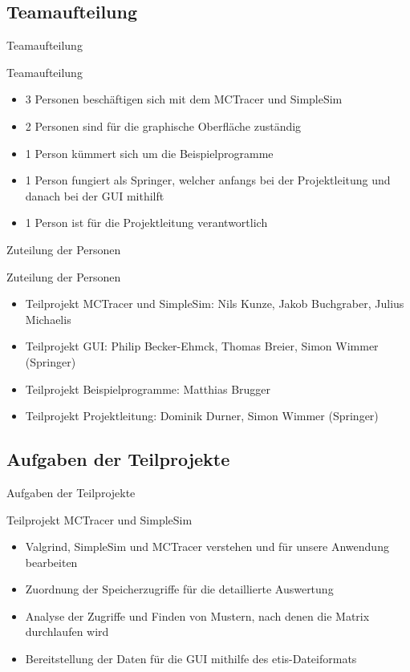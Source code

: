 \begin{frame}
\end{frame}

\subsection{Teamaufteilung}
\begin{frame}{Teamaufteilung}
\begin{block}{Teamaufteilung}
\begin{itemize}[<+->]
\pause\item 3 Personen beschäftigen sich mit dem MCTracer und SimpleSim
\item 2 Personen sind für die graphische Oberfläche zuständig
\item 1 Person kümmert sich um die Beispielprogramme
\item 1 Person fungiert als Springer, welcher anfangs bei der Projektleitung und danach bei der GUI mithilft
\item 1 Person ist für die Projektleitung verantwortlich
\end{itemize}
\end{block}
\end{frame}

\begin{frame}{Zuteilung der Personen}
\begin{block}{Zuteilung der Personen}
\begin{itemize}[<+->]
\pause\item Teilprojekt MCTracer und SimpleSim: Nils Kunze, Jakob Buchgraber, Julius Michaelis
\item Teilprojekt GUI: Philip Becker-Ehmck, Thomas Breier, Simon Wimmer (Springer)
\item Teilprojekt Beispielprogramme: Matthias Brugger
\item Teilprojekt Projektleitung: Dominik Durner, Simon Wimmer (Springer)
\end{itemize}
\end{block}
\end{frame}

\subsection{Aufgaben der Teilprojekte}

\begin{frame}{Aufgaben der Teilprojekte}
\begin{block}{Teilprojekt MCTracer und SimpleSim}
\begin{itemize}[<+->]
\pause\item Valgrind, SimpleSim und MCTracer verstehen und für unsere Anwendung bearbeiten
\item Zuordnung der Speicherzugriffe für die detaillierte Auswertung
\item Analyse der Zugriffe und Finden von Mustern, nach denen die Matrix durchlaufen wird
\item Bereitstellung der Daten für die GUI mithilfe des \glqq etis\grqq-Dateiformats
\end{itemize}
\end{block}
\end{frame}

